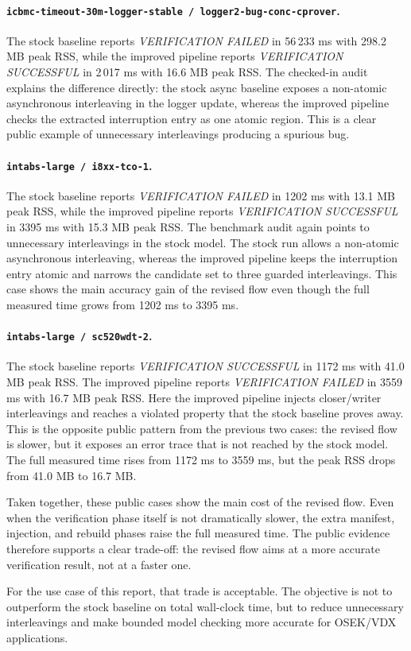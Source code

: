 \paragraph{\texttt{icbmc-timeout-30m-logger-stable / logger2-bug-conc-cprover}.}
The stock baseline reports \emph{VERIFICATION FAILED} in 56\,233 ms with 298.2 MB peak RSS,
while the improved pipeline reports \emph{VERIFICATION SUCCESSFUL} in 2\,017 ms with
16.6 MB peak RSS. The checked-in audit explains the difference directly: the stock async
baseline exposes a non-atomic asynchronous interleaving in the logger update, whereas the
improved pipeline checks the extracted interruption entry as one atomic region. This is a
clear public example of unnecessary interleavings producing a spurious bug.

\paragraph{\texttt{intabs-large / i8xx-tco-1}.}
The stock baseline reports \emph{VERIFICATION FAILED} in 1202 ms with 13.1 MB peak RSS, while
the improved pipeline reports \emph{VERIFICATION SUCCESSFUL} in 3395 ms with 15.3 MB peak RSS.
The benchmark audit again points to unnecessary interleavings in the stock model. The stock
run allows a non-atomic asynchronous interleaving, whereas the improved pipeline keeps the
interruption entry atomic and narrows the candidate set to three guarded interleavings. This
case shows the main accuracy gain of the revised flow even though the full measured time grows
from 1202 ms to 3395 ms.

\paragraph{\texttt{intabs-large / sc520wdt-2}.}
The stock baseline reports \emph{VERIFICATION SUCCESSFUL} in 1172 ms with 41.0 MB peak RSS.
The improved pipeline reports \emph{VERIFICATION FAILED} in 3559 ms with 16.7 MB peak RSS.
Here the improved pipeline injects closer/writer interleavings and reaches a violated
property that the stock baseline proves away. This is the opposite public pattern from the
previous two cases: the revised flow is slower, but it exposes an error trace that is not
reached by the stock model. The full measured time rises from 1172 ms to 3559 ms, but the
peak RSS drops from 41.0 MB to 16.7 MB.

Taken together, these public cases show the main cost of the revised flow. Even when the
verification phase itself is not dramatically slower, the extra manifest, injection, and
rebuild phases raise the full measured time. The public evidence therefore supports a clear
trade-off: the revised flow aims at a more accurate verification result, not at a faster one.

For the use case of this report, that trade is acceptable. The objective is not to outperform
the stock baseline on total wall-clock time, but to reduce unnecessary interleavings and make
bounded model checking more accurate for OSEK/VDX applications.
